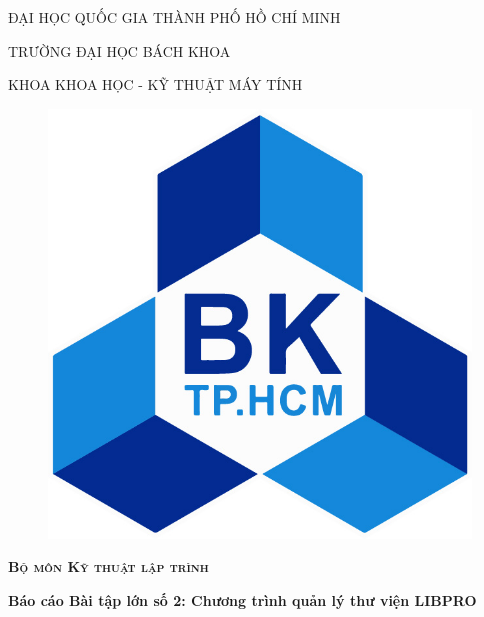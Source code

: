 \documentclass[12pt,a4paper]{report}
\begin{document}
    \begin{titlepage}
        \begin{center}
            {\scshape\large ĐẠI HỌC QUỐC GIA THÀNH PHỐ HỒ CHÍ MINH\par}
                    {\scshape\LARGE TRƯỜNG ĐẠI HỌC BÁCH KHOA\par}
            {\scshape\Large KHOA KHOA HỌC - KỸ THUẬT MÁY TÍNH}
            \vspace{2cm}

        \end{center}
        \begin{figure}[H]
            \centering
            \includegraphics[scale=.2]{LogoBK.jpg}
        \end{figure}
        \vspace{2cm}
        \begin{center}
            {\scshape \LARGE \textbf{Bộ môn Kỹ thuật lập trình}\par}
            \vspace{1cm}
            \Large \textbf{Báo cáo Bài tập lớn số 2: Chương trình quản lý thư viện LIBPRO}
        \end{center}
        \vspace{2cm}
        \begin{center}
            \begin{tabular}{r l}

\end{tabular}
\end{center}
\end{titlepage}
\end{document}
